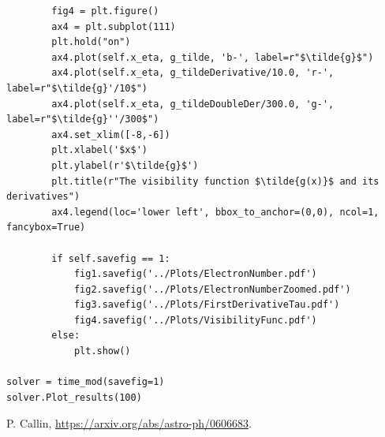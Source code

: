 \documentclass[12pt]{article}
\begin{document}
\begin{lstlisting}
		fig4 = plt.figure()
		ax4 = plt.subplot(111)
		plt.hold("on")
		ax4.plot(self.x_eta, g_tilde, 'b-', label=r"$\tilde{g}$")
		ax4.plot(self.x_eta, g_tildeDerivative/10.0, 'r-', label=r"$\tilde{g}'/10$")
		ax4.plot(self.x_eta, g_tildeDoubleDer/300.0, 'g-', label=r"$\tilde{g}''/300$")
		ax4.set_xlim([-8,-6])
		plt.xlabel('$x$')
		plt.ylabel(r'$\tilde{g}$')
		plt.title(r"The visibility function $\tilde{g(x)}$ and its derivatives")
		ax4.legend(loc='lower left', bbox_to_anchor=(0,0), ncol=1, fancybox=True)
		
		if self.savefig == 1:
			fig1.savefig('../Plots/ElectronNumber.pdf')
			fig2.savefig('../Plots/ElectronNumberZoomed.pdf')
			fig3.savefig('../Plots/FirstDerivativeTau.pdf')
			fig4.savefig('../Plots/VisibilityFunc.pdf')
		else:
			plt.show()

solver = time_mod(savefig=1)
solver.Plot_results(100)
\end{lstlisting}

\begin{thebibliography}{1}
     P. Callin, \url{https://arxiv.org/abs/astro-ph/0606683}.
\end{thebibliography}
\end{document}

